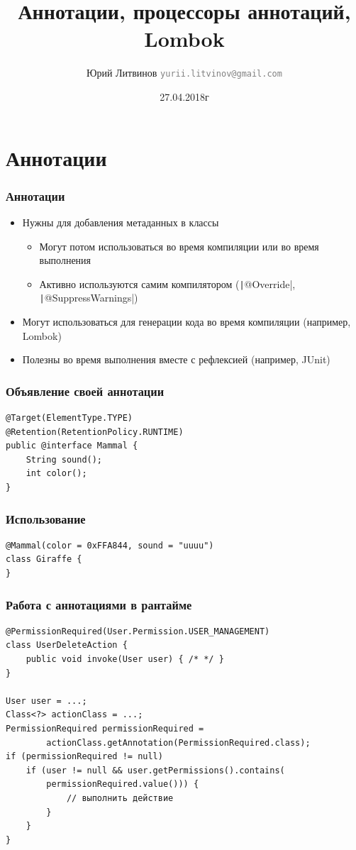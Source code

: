 \documentclass[xetex,mathserif,serif]{beamer}
\title{Аннотации, процессоры аннотаций, Lombok}
\author[Юрий Литвинов]{Юрий Литвинов \newline \textcolor{gray}{\small\texttt{yurii.litvinov@gmail.com}}}
\date{27.04.2018г}
\begin{document}
	
	\frame{\titlepage}

	\section{Аннотации}

	\begin{frame}
		\frametitle{Аннотации}
		\begin{itemize}
			\item Нужны для добавления метаданных в классы
			\begin{itemize}
				\item Могут потом использоваться во время компиляции или во время выполнения
				\item Активно используются самим компилятором (\texttt|@Override|, \texttt|@SuppressWarnings|)
			\end{itemize}
			\item Могут использоваться для генерации кода во время компиляции (например, Lombok)
			\item Полезны во время выполнения вместе с рефлексией (например, JUnit)
		\end{itemize}
	\end{frame}

	\begin{frame}[fragile]
		\frametitle{Объявление своей аннотации}
		\begin{verbatim}
@Target(ElementType.TYPE)
@Retention(RetentionPolicy.RUNTIME)
public @interface Mammal {
    String sound();
    int color();
}
		\end{verbatim}
	\end{frame}

	\begin{frame}[fragile]
		\frametitle{Использование}
		\begin{verbatim}
@Mammal(color = 0xFFA844, sound = "uuuu")
class Giraffe {
}
		\end{verbatim}
	\end{frame}

	\begin{frame}[fragile]
		\frametitle{Работа с аннотациями в рантайме}
		\begin{verbatim}
@PermissionRequired(User.Permission.USER_MANAGEMENT)
class UserDeleteAction {
    public void invoke(User user) { /* */ }
}

User user = ...;
Class<?> actionClass = ...;
PermissionRequired permissionRequired =
        actionClass.getAnnotation(PermissionRequired.class);
if (permissionRequired != null)
    if (user != null && user.getPermissions().contains(
        permissionRequired.value())) {
            // выполнить действие
        }
    }
}
		\end{verbatim}
	\end{frame}
	
\end{document}
